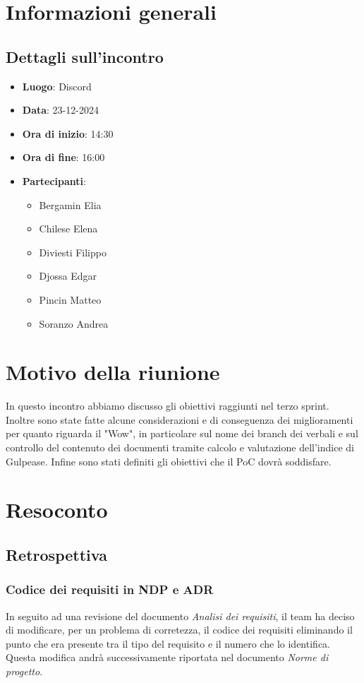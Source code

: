 \section{Informazioni generali}
\subsection{Dettagli sull'incontro}
\begin{itemize}
    \item \textbf{Luogo}: Discord
    \item \textbf{Data}: 23-12-2024
    \item \textbf{Ora di inizio}: 14:30
    \item \textbf{Ora di fine}: 16:00
    \item \textbf{Partecipanti}:
    \begin{itemize}
        \item Bergamin Elia
        \item Chilese Elena
        \item Diviesti Filippo
        \item Djossa Edgar
        \item Pincin Matteo 
        \item Soranzo Andrea  
    \end{itemize}
\end{itemize}

\section{Motivo della riunione}
In questo incontro abbiamo discusso gli obiettivi raggiunti nel terzo sprint. Inoltre sono state fatte alcune considerazioni e di conseguenza dei miglioramenti
per quanto riguarda il "Wow", in particolare sul nome dei branch dei verbali e sul controllo del contenuto dei documenti tramite calcolo e valutazione dell'indice di Gulpease.
Infine sono stati definiti gli obiettivi che il PoC dovrà soddisfare.

\section{Resoconto}
\subsection{Retrospettiva}

\subsubsection{Codice dei requisiti in NDP e ADR}
In seguito ad una revisione del documento \textit{Analisi dei requisiti}, il team ha deciso di modificare, per un problema di corretezza, il codice dei requisiti eliminando il punto che era presente tra il tipo del requisito e il numero che lo identifica.
Questa modifica andrà successivamente riportata nel documento \textit{Norme di progetto}.

